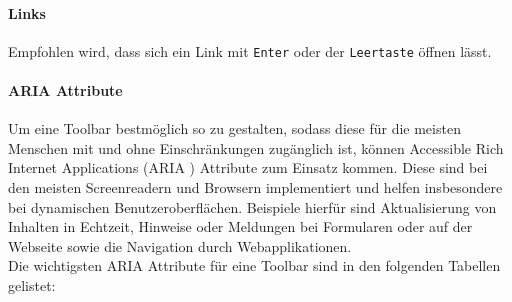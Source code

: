 \paragraph{Links}
Empfohlen wird, dass sich ein Link mit \texttt{Enter} oder der  \texttt{Leertaste} öffnen lässt.  

\paragraph{ARIA Attribute}
Um eine Toolbar bestmöglich so zu gestalten, sodass diese für die meisten Menschen mit und ohne 
Einschränkungen zugänglich ist, können Accessible Rich Internet Applications (ARIA \cite{wai_aria_2020}) Attribute zum Einsatz kommen.  
Diese sind bei den meisten Screenreadern und Browsern implementiert und helfen insbesondere bei dynamischen 
Benutzeroberflächen. Beispiele hierfür sind Aktualisierung von Inhalten in Echtzeit, Hinweise oder Meldungen  bei 
Formularen oder auf der Webseite sowie die Navigation durch Webapplikationen. \\
Die wichtigsten ARIA Attribute für eine Toolbar sind in den folgenden Tabellen gelistet:

